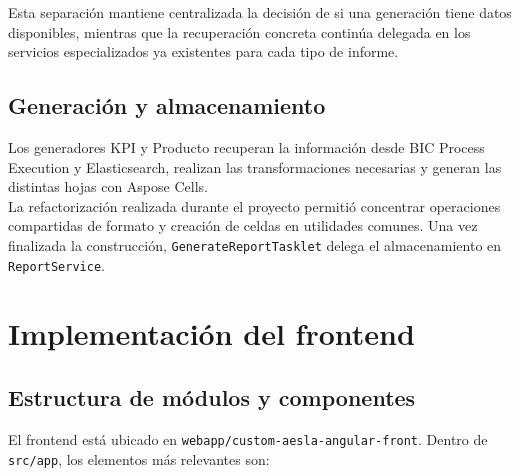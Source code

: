 \documentclass[11pt,a4paper,titlepage,oneside]{report}
\begin{document}
Esta separación mantiene centralizada la decisión de si una generación tiene
datos disponibles, mientras que la recuperación concreta continúa delegada en
los servicios especializados ya existentes para cada tipo de informe.

\subsection{Generación y almacenamiento}

Los generadores KPI y Producto recuperan la información desde BIC Process
Execution y Elasticsearch, realizan las transformaciones necesarias y generan
las distintas hojas con Aspose Cells. \\

La refactorización realizada durante el proyecto permitió concentrar
operaciones compartidas de formato y creación de celdas en utilidades comunes.
Una vez finalizada la construcción, \texttt{GenerateReportTasklet} delega el
almacenamiento en \texttt{ReportService}.

\section{Implementación del frontend}

\subsection{Estructura de módulos y componentes}

El frontend está ubicado en
\texttt{webapp/custom-aesla-angular-front}. Dentro de \texttt{src/app}, los
elementos más relevantes son:
\end{document}
